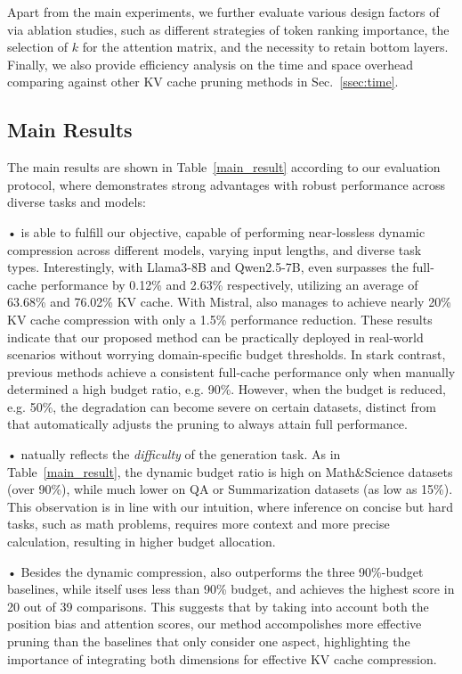 Apart from the main experiments, we further evaluate various design factors of \method via ablation studies, such as different strategies of token ranking importance, the selection of $k$ for the attention matrix, and the necessity to retain bottom layers.
Finally, we also provide efficiency analysis on the time and space overhead comparing against other KV cache pruning methods in Sec.~\ref{ssec:time}.

\subsection{Main Results}
\label{ssec:main}

The main results are shown in Table~\ref{main_result} according to our evaluation protocol, where \method demonstrates strong advantages with robust performance across diverse tasks and models:

• \method is able to fulfill our objective, capable of performing near-lossless dynamic compression across different models, varying input lengths, and diverse task types. Interestingly, with Llama3-8B and Qwen2.5-7B, \method even surpasses the full-cache performance by 0.12\% and 2.63\% respectively, utilizing an average of 63.68\% and 76.02\% KV cache. With Mistral, \method also manages to achieve nearly 20\% KV cache compression with only a 1.5\% performance reduction. These results indicate that our proposed method can be practically deployed in real-world scenarios without worrying domain-specific budget thresholds. In stark contrast, previous methods achieve a consistent full-cache performance only when manually determined a high budget ratio, e.g. 90\%. However, when the budget is reduced, e.g. 50\%, the degradation can become severe on certain datasets, distinct from \method that automatically adjusts the pruning to always attain full performance.




• \method natually reflects the \emph{difficulty} of the generation task. As in Table~\ref{main_result}, the dynamic budget ratio is high on Math\&Science datasets (over 90\%), while much lower on QA or Summarization datasets (as low as 15\%). This observation is in line with our intuition, where inference on concise but hard tasks, such as math problems, requires more context and more precise calculation, resulting in higher budget allocation.

• Besides the dynamic compression, \method also outperforms the three 90\%-budget baselines, while itself uses less than 90\% budget, and achieves the highest score in 20 out of 39 comparisons. This suggests that by taking into account both the position bias and attention scores, our method accompolishes more effective pruning than the baselines that only consider one aspect, highlighting the importance of integrating both dimensions for effective KV cache compression.

